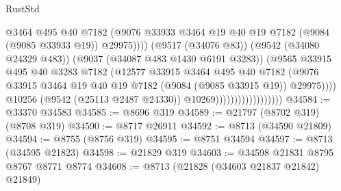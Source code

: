 \begin{lexlean}{RustStd}
\begin{coremodule}
                                                @3464
                                                @495
                                                @40
                                                @7182
                                                (@9076
                                                  @33933
                                                  @3464
                                                  @19
                                                  @40
                                                  @19
                                                  @7182
                                                  (@9084 (@9085 @33933 @19))
                                                  @29975))))
                                          (@9517 (@34076 @83))
                                          (@9542 (@34080 @24329 @483))
                                          (@9037 (@34087 @483 @1430 @6191 @3283))
                                          (@9565
                                            @33915
                                            @495
                                            @40
                                            @3283
                                            @7182
                                            (@12577
                                              @33915
                                              @3464
                                              @495
                                              @40
                                              @7182
                                              (@9076
                                                @33915
                                                @3464
                                                @19
                                                @40
                                                @19
                                                @7182
                                                (@9084 (@9085 @33915 @19))
                                                @29975))))
                                        @10256
                                        (@9542 (@25113 @2487 @24330))
                                        @10269))))))))))))))))))
@34584 := @33370 @34583
@34585 := @8696 @319
@34589 := @21797 (@8702 @319) (@8708 @319)
@34590 := @8717 @26911
@34592 := @8713 (@34590 @21809)
@34594 := @8755 (@8756 @319)
@34595 := @8751 @34594
@34597 := @8713 (@34595 @21823)
@34598 := @21829 @319
@34603 := @34598 @21831 @8795 @8767 @8771 @8774
@34608 := @8713 (@21828 (@34603 @21837 @21842) @21849)

\end{coremodule}
\end{lexlean}
